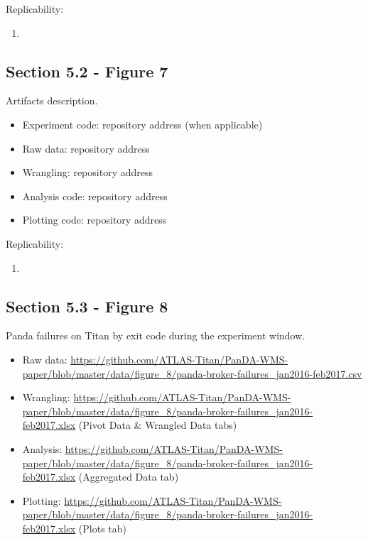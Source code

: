 Replicability:

\begin{enumerate}
    \item
\end{enumerate}


\subsection{Section 5.2 - Figure 7}
\label{apndx:fig7}

Artifacts description.

\begin{itemize}
    \item Experiment code: repository address (when applicable)
    \item Raw data: repository address
    \item Wrangling: repository address
    \item Analysis code: repository address
    \item Plotting code: repository address
\end{itemize}

Replicability:

\begin{enumerate}
    \item
\end{enumerate}


\subsection{Section 5.3 - Figure 8}
\label{apndx:fig8}

Panda failures on Titan by exit code during the experiment window.

\begin{itemize}
    \item Raw data: \url{https://github.com/ATLAS-Titan/PanDA-WMS-paper/blob/master/data/figure_8/panda-broker-failures_jan2016-feb2017.csv}
    \item Wrangling: \url{https://github.com/ATLAS-Titan/PanDA-WMS-paper/blob/master/data/figure_8/panda-broker-failures_jan2016-feb2017.xlsx} (Pivot Data \& Wrangled Data tabs)
    \item Analysis: \url{https://github.com/ATLAS-Titan/PanDA-WMS-paper/blob/master/data/figure_8/panda-broker-failures_jan2016-feb2017.xlsx} (Aggregated Data tab)
    \item Plotting: \url{https://github.com/ATLAS-Titan/PanDA-WMS-paper/blob/master/data/figure_8/panda-broker-failures_jan2016-feb2017.xlsx} (Plots tab)
\end{itemize}

